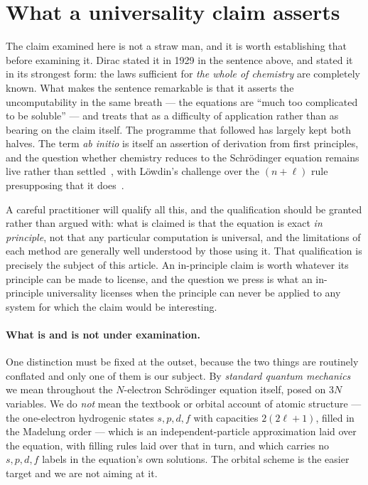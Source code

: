 \documentclass[11pt]{article}
\begin{document}
\section{What a universality claim asserts}\label{sec:what}

The claim examined here is not a straw man, and it is worth establishing that before examining it.
Dirac stated it in 1929 in the sentence above, and stated it in its strongest form: the laws
sufficient for \emph{the whole of chemistry} are completely known. What makes the sentence
remarkable is that it asserts the uncomputability in the same breath --- the equations are ``much
too complicated to be soluble'' --- and treats that as a difficulty of application rather than as
bearing on the claim itself. The programme that followed has largely kept both halves. The term
\emph{ab initio} is itself an assertion of derivation from first principles, and the question
whether chemistry reduces to the Schr\"odinger equation remains live rather than
settled~\cite{Scerri}, with L\"owdin's challenge over the $(n{+}\ell)$ rule presupposing that it
does~\cite{Lowdin1969,AllenKnight2002}.

A careful practitioner will qualify all this, and the qualification should be granted rather than
argued with: what is claimed is that the equation is exact \emph{in principle}, not that any
particular computation is universal, and the limitations of each method are generally well
understood by those using it. That qualification is precisely the subject of this article. An
in-principle claim is worth whatever its principle can be made to license, and the question we
press is what an in-principle universality licenses when the principle can never be applied to
any system for which the claim would be interesting.

\paragraph{What is and is not under examination.} One distinction must be fixed at the outset,
because the two things are routinely conflated and only one of them is our subject. By
\emph{standard quantum mechanics} we mean throughout the $N$-electron Schr\"odinger equation
itself, posed on $3N$ variables. We do \emph{not} mean the textbook or orbital account of atomic
structure --- the one-electron hydrogenic states $s,p,d,f$ with capacities $2(2\ell{+}1)$, filled
in the Madelung order --- which is an independent-particle approximation laid over the equation,
with filling rules laid over that in turn, and which carries no $s,p,d,f$ labels in the equation's
own solutions. The orbital scheme is the easier target and we are not aiming at it.
\end{document}
